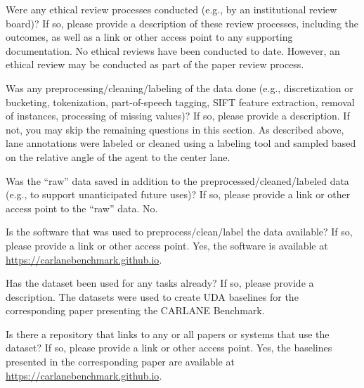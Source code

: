 \documentclass{article}
\begin{document}
	\begin{datasheetitem}{Were any ethical review processes conducted (e.g., by an institutional review board)? \normalfont If so, please provide a description of these review processes, including the outcomes, as well as a link or other access point to any supporting documentation.}
		No ethical reviews have been conducted to date. However, an ethical review may be conducted as part of the paper review process.
	\end{datasheetitem}
	\begin{datasheetitem}{Was any preprocessing/cleaning/labeling of the data done (e.g., discretization or bucketing, tokenization, part-of-speech tagging, SIFT feature extraction, removal of instances, processing of missing values)? \normalfont If so, please provide a description. If not, you may skip the remaining questions in this section.}
		As described above, lane annotations were labeled or cleaned using a labeling tool and sampled based on the relative angle  of the agent to the center lane.
	\end{datasheetitem}
	\begin{datasheetitem}{Was the “raw” data saved in addition to the preprocessed/cleaned/labeled data (e.g., to support unanticipated future uses)? \normalfont If so, please provide a link or other access point to the “raw” data.}
		No.
	\end{datasheetitem}
	\begin{datasheetitem}{Is the software that was used to preprocess/clean/label the data available? \normalfont If so, please provide a link or other access point.}
		Yes, the software is available at \url{https://carlanebenchmark.github.io}.
	\end{datasheetitem}
	\begin{datasheetitem}{Has the dataset been used for any tasks already? \normalfont If so, please provide a description.}
		The datasets were used to create UDA baselines for the corresponding paper presenting the CARLANE Benchmark.
	\end{datasheetitem}
	\begin{datasheetitem}{Is there a repository that links to any or all papers or systems that use the dataset? \normalfont If so, please provide a link or other access point.}
		Yes, the baselines presented in the corresponding paper are available at \url{https://carlanebenchmark.github.io}.
	\end{datasheetitem}
\end{document}
